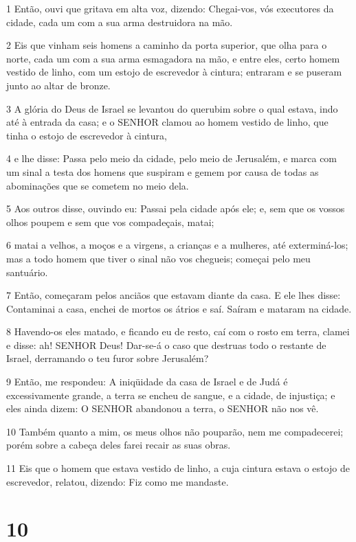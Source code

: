 \par 1 Então, ouvi que gritava em alta voz, dizendo: Chegai-vos, vós executores da cidade, cada um com a sua arma destruidora na mão.
\par 2 Eis que vinham seis homens a caminho da porta superior, que olha para o norte, cada um com a sua arma esmagadora na mão, e entre eles, certo homem vestido de linho, com um estojo de escrevedor à cintura; entraram e se puseram junto ao altar de bronze.
\par 3 A glória do Deus de Israel se levantou do querubim sobre o qual estava, indo até à entrada da casa; e o SENHOR clamou ao homem vestido de linho, que tinha o estojo de escrevedor à cintura,
\par 4 e lhe disse: Passa pelo meio da cidade, pelo meio de Jerusalém, e marca com um sinal a testa dos homens que suspiram e gemem por causa de todas as abominações que se cometem no meio dela.
\par 5 Aos outros disse, ouvindo eu: Passai pela cidade após ele; e, sem que os vossos olhos poupem e sem que vos compadeçais, matai;
\par 6 matai a velhos, a moços e a virgens, a crianças e a mulheres, até exterminá-los; mas a todo homem que tiver o sinal não vos chegueis; começai pelo meu santuário.
\par 7 Então, começaram pelos anciãos que estavam diante da casa. E ele lhes disse: Contaminai a casa, enchei de mortos os átrios e saí. Saíram e mataram na cidade.
\par 8 Havendo-os eles matado, e ficando eu de resto, caí com o rosto em terra, clamei e disse: ah! SENHOR Deus! Dar-se-á o caso que destruas todo o restante de Israel, derramando o teu furor sobre Jerusalém?
\par 9 Então, me respondeu: A iniqüidade da casa de Israel e de Judá é excessivamente grande, a terra se encheu de sangue, e a cidade, de injustiça; e eles ainda dizem: O SENHOR abandonou a terra, o SENHOR não nos vê.
\par 10 Também quanto a mim, os meus olhos não pouparão, nem me compadecerei; porém sobre a cabeça deles farei recair as suas obras.
\par 11 Eis que o homem que estava vestido de linho, a cuja cintura estava o estojo de escrevedor, relatou, dizendo: Fiz como me mandaste.

\chapter{10}


